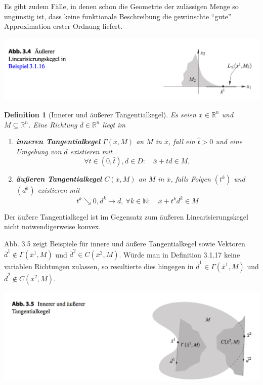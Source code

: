 \documentclass[11pt]{scrreprt}
\newcounter{thm}
\theoremstyle{thmstyle}
\numberwithin{thm}{section}
\newtheorem{definition}[thm]{Definition}
\begin{document}
Es gibt zudem Fälle, in denen schon die Geometrie der zulässigen Menge so ungünstig ist, dass keine funktionale Beschreibung die gewünschte \enquote{gute} Approximation erster Ordnung liefert.

\begin{center}
	\includegraphics[scale=0.5]{img/ab34}
\end{center}

\setcounter{thm}{16}

\begin{definition}[Innerer und äußerer Tangentialkegel]
	Es seien $\overline{x} \in \mathbb{R}^n$ und $M \subseteq \mathbb{R}^n$. Eine Richtung $\overline{d} \in \mathbb{R}^n$ liegt im
	\begin{enumerate}[label=\alph*\upshape)]
		\item \textbf{inneren Tangentialkegel} $\Gamma(\overline{x}, M)$ an $M$ in $\overline{x}$, fall ein $\hat{t} > 0$ und eine Umgebung von $\overline{d}$ existieren mit 
			$$ \forall t \in (0, \hat{t}), d \in D: \quad \overline{x} +td \in M, $$
		\item \textbf{äußeren Tangentialkegel} $C(\overline{x}, M)$ an $M$ in $\overline{x}$, falls Folgen $(t^k)$ und $(d^k)$ existieren mit
			$$ t^k \searrow 0, d^k \rightarrow \overline{d}, ~\forall k \in \mathbb{N}: \quad \overline{x} + t^k d^k \in M $$
	\end{enumerate}	
\end{definition}

Der äußere Tangentialkegel ist im Gegensatz zum äußeren Linearisierungskegel nicht notwendigerweise konvex.

Abb. 3.5 zeigt Beispiele für innere und äußere Tangentialkegel sowie Vektoren $\overline{d}^1 \notin \Gamma(\overline{x}^1, M)$ und $\overline{d}^2 \in C(\overline{x}^2, M)$. Würde man in Definition 3.1.17 keine variablen Richtungen zulassen, so resultierte dies hingegen in $\overline{d}^1 \in \Gamma(\overline{x}^1, M)$ und $\overline{d}^2 \notin C(\overline{x}^2, M)$.

\begin{center}
	\includegraphics[scale=0.5]{img/ab35}
\end{center}
\end{document}

